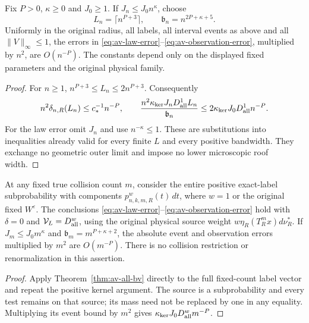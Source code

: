 \begin{corollary}
\label{cor:av-polynomial}
Fix $P>0$, $\kappa\ge0$ and $J_0\ge1$.  If
$J_n\le J_0n^\kappa$, choose
\begin{equation}\label{eq:av-polynomial-scales}
 L_n=\lceil n^{P+3}\rceil,\qquad
 \mathfrak b_n=n^{2P+\kappa+5}.
\end{equation}
Uniformly in the original radius, all labels, all interval events
as above and all $\|V\|_\infty\le1$, the errors in
\eqref{eq:av-law-error}--\eqref{eq:av-observation-error}, multiplied
by $n^2$, are $O(n^{-P})$.  The constants depend only on the
displayed fixed parameters and the original physical family.
\end{corollary}
\begin{proof}
For $n\ge1$, $n^{P+3}\le L_n\le2n^{P+3}$.  Consequently
\[
 n^2\delta_{n,R}(L_n)\le c_*^{-1}n^{-P},\qquad
 \frac{n^2\kappa_{\rm ker}J_nD_{\rm all}^{1}L_n}{\mathfrak b_n}
        \le2\kappa_{\rm ker}J_0D_{\rm all}^{1}n^{-P}.
\]
For the law error omit $J_n$ and use $n^{-\kappa}\le1$.
These are substitutions into inequalities already valid for every
finite $L$ and every positive bandwidth.  They exchange no
geometric outer limit and impose no lower microscopic roof width.
\end{proof}

\begin{corollary}
\label{cor:av-fixed-collision}
At any fixed true collision count $m$, consider the entire positive
exact-label subprobability with components $p^w_{n,k,m,R}(t)\,dt$,
where $w=1$ or the original fixed $W^\varepsilon$.  The conclusions
\eqref{eq:av-law-error}--\eqref{eq:av-observation-error} hold with
$\delta=0$ and $\mathcal V_L=D_{\rm all}^w$, using the original
physical source weight $w\eta_R(T_R^mx)d\nu_R^*$.
If $J_m\le J_0m^\kappa$ and
$\mathfrak b_m=m^{P+\kappa+2}$, the absolute event and observation
errors multiplied by $m^2$ are $O(m^{-P})$.  There is no collision
restriction or renormalization in this assertion.
\end{corollary}
\begin{proof}
Apply Theorem~\ref{thm:av-all-bv} directly to the full fixed-count
label vector and repeat the positive kernel argument.  The source
is a subprobability and every test remains on that source; its mass
need not be replaced by one in any equality.  Multiplying its
event bound by $m^2$ gives
$\kappa_{\rm ker}J_0D_{\rm all}^wm^{-P}$.
\end{proof}

